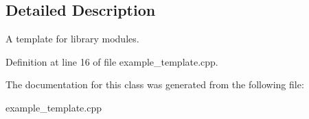 \subsection{Detailed Description}
A template for library modules. 

Definition at line 16 of file example\+\_\+template.\+cpp.



The documentation for this class was generated from the following file\+:\begin{DoxyCompactItemize}
\item 
example\+\_\+template.\+cpp\end{DoxyCompactItemize}
